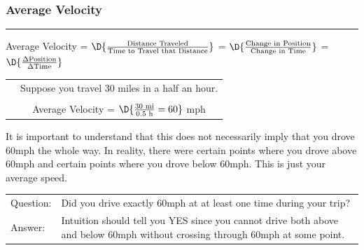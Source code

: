 \begin{frame}
\frametitle{Average Velocity}
\BCOLS\BCOL{0cm}\ECOL\BCOL{15.5cm}\hrule\BCOLS\BCOL{0cm}\ECOL\BCOL{15.5cm}

\vspace{0.2cm}

\begin{center}
	Average Velocity = $\D{\frac{\text{Distance Traveled}}{\text{Time to Travel that Distance}}}$ = $\D{\frac{\text{Change in Position}}{\text{Change in Time}}}$ = $\D{\frac{\Delta\text{Position}}{\Delta\text{Time}}}$ 
\end{center}

\vspace{0.3cm}

{\setlength{\extrarowheight}{-0.2cm}
\begin{tabular}{p{0.25cm}p{13.6cm}}
	\EX & Suppose you travel 30 miles in a half an hour.\\\\
	& \multicolumn{1}{c}{Average Velocity = $\D{\frac{30 \text{ mi}}{0.5 \text{ h}} = 60}$ mph}\\
\end{tabular}}

\vspace{0.5cm}

It is important to understand that this does not necessarily imply that you drove 60mph the whole way.  In reality, there were certain points where you drove above 60mph and certain points where you drove below 60mph.  This is just your average speed.

\vspace{0.4cm}

{\setlength{\extrarowheight}{0.1cm}
\begin{tabular}{p{1.35cm}p{12.6cm}}
	Question: & Did you drive exactly 60mph at at least one time during your trip?\\
	Answer: & Intuition should tell you YES since you cannot drive both above and below 60mph without crossing through 60mph at some point. \\
\end{tabular}}

\ECOL\BCOL{0cm}\ECOL\ECOLS\vspace{8.2cm}\ECOL\BCOL{0cm}\ECOL\ECOLS
\end{frame}

